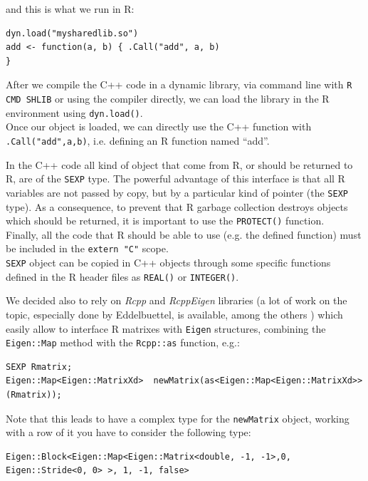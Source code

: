 and this is what we run in R:

\begin{lstlisting}
dyn.load("mysharedlib.so")
add <- function(a, b) { .Call("add", a, b)
}
\end{lstlisting}

After we compile the C++ code in a dynamic library, via command line with \verb|R CMD SHLIB| or using the compiler directly, we can load the library in the R environment using \verb|dyn.load()|. \\ Once our object is loaded, we can directly use the C++ function with \verb|.Call("add",a,b)|, i.e. defining an R function named ``add''.

In the C++ code all kind of object that come from R, or should be returned to R, are of the \verb|SEXP| type. The powerful advantage of this interface is that all R variables are not passed by copy, but by a particular kind of pointer (the \verb|SEXP| type). As a consequence, to prevent that R garbage collection destroys objects which should be returned, it is important to use the \verb|PROTECT()| function. \\ Finally, all the code that R should be able to use (e.g. the defined function) must be included in the \verb|extern "C"| scope. \\ \verb|SEXP| object can be copied in C++ objects through some specific functions defined in the R header files as \verb|REAL()| or \verb|INTEGER()|. 
 
\medskip

We decided also to rely on \emph{Rcpp} and \emph{RcppEigen} libraries (a lot of work on the topic, especially done by Eddelbuettel, is available, among the others \cite{dirk:rcpp}) which easily allow to interface R matrixes with \verb|Eigen| structures, combining the \verb|Eigen::Map| method with the \verb|Rcpp::as| function, e.g.:

\begin{lstlisting}
SEXP Rmatrix;
Eigen::Map<Eigen::MatrixXd>  newMatrix(as<Eigen::Map<Eigen::MatrixXd>> (Rmatrix));
\end{lstlisting}

Note that this leads to have a complex type for the \verb|newMatrix| object, working with a row of it you have to consider the following type:

\begin{lstlisting}
Eigen::Block<Eigen::Map<Eigen::Matrix<double, -1, -1>,0, Eigen::Stride<0, 0> >, 1, -1, false>
\end{lstlisting}

